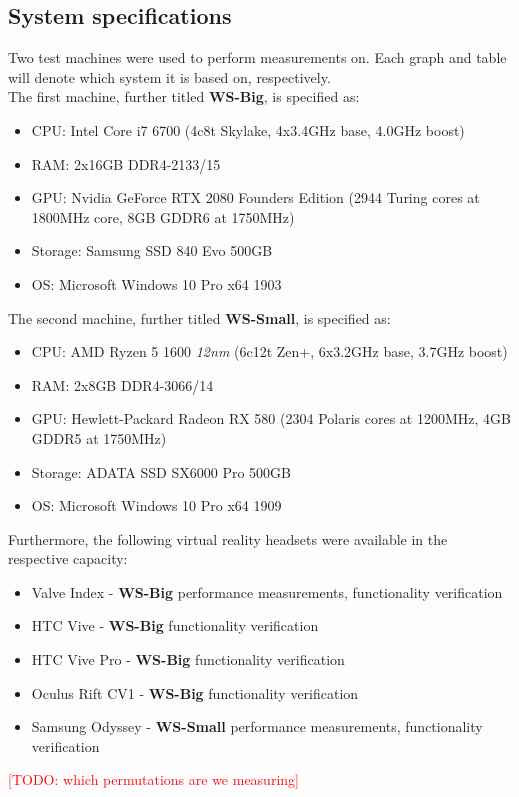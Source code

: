 \subsection{System specifications}
Two test machines were used to perform measurements on. Each graph and table will denote which system it is based on, respectively. \\
The first machine, further titled \textbf{WS-Big}, is specified as:
\begin{itemize}
\item CPU: Intel Core i7 6700 (4c8t Skylake, 4x3.4GHz base, 4.0GHz boost)
\item RAM: 2x16GB DDR4-2133/15
\item GPU: Nvidia GeForce RTX 2080 Founders Edition (2944 Turing cores at 1800MHz core, 8GB GDDR6 at 1750MHz)
\item Storage: Samsung SSD 840 Evo 500GB
\item OS: Microsoft Windows 10 Pro x64 1903
\end{itemize} 
The second machine, further titled \textbf{WS-Small}, is specified as:
\begin{itemize}
\item CPU: AMD Ryzen 5 1600 \textit{12nm} (6c12t Zen+, 6x3.2GHz base, 3.7GHz boost)
\item RAM: 2x8GB DDR4-3066/14
\item GPU: Hewlett-Packard Radeon RX 580 (2304 Polaris cores at 1200MHz, 4GB GDDR5 at 1750MHz)
\item Storage: ADATA SSD SX6000 Pro 500GB
\item OS: Microsoft Windows 10 Pro x64 1909
\end{itemize} 
Furthermore, the following virtual reality headsets were available in the respective capacity:
\begin{itemize}
\item Valve Index - \textbf{WS-Big} performance measurements, functionality verification
\item HTC Vive - \textbf{WS-Big} functionality verification
\item HTC Vive Pro - \textbf{WS-Big} functionality verification
\item Oculus Rift CV1 - \textbf{WS-Big} functionality verification
\item Samsung Odyssey - \textbf{WS-Small} performance measurements, functionality verification
\end{itemize} 

\textcolor{red}{[TODO: which permutations are we measuring]}